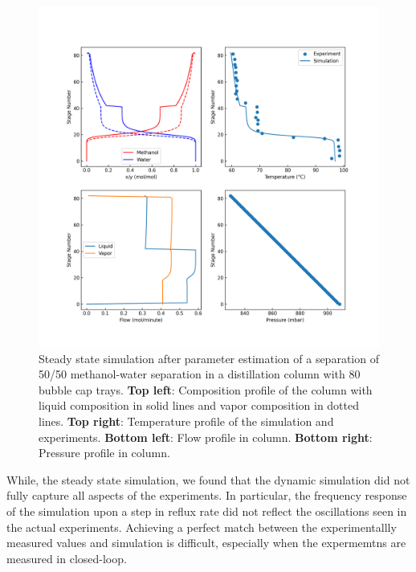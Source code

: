 \begin{figure}
    \centering
    \includegraphics[width=\textwidth]{gfx/Chapter06/2021_11_17_steady_state_estimated.png}
    \caption{Steady state simulation after parameter estimation of a separation of 50/50 methanol-water separation in a distillation column with 80 bubble cap trays. \textbf{Top left}: Composition profile of the column with liquid composition in solid lines and vapor composition in dotted lines. \textbf{Top right}: Temperature profile of the simulation and experiments. \textbf{Bottom left}: Flow profile in column. \textbf{Bottom right}: Pressure profile in column.}
    \label{fig:estimated}
\end{figure}

While, the steady state simulation, we found that the dynamic simulation did not fully capture all aspects of the experiments. In particular, the frequency response of the simulation upon a step in reflux rate did not reflect the oscillations seen in the actual experiments. Achieving a perfect match between the experimentallly measured values and simulation is difficult, especially when the expermemtns are measured in closed-loop. 


